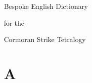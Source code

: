 \documentclass[12pt,a4paper,twoside]{article} %
\begin{document}
\pagestyle{empty}
\headrule
\vspace{1cm}

\huge
\noindent Bespoke English Dictionary

\noindent for the  

\noindent Cormoran Strike Tetralogy
\vspace{0.7cm}
\footrule

\normalsize
\newpage
\phantom{text}

\newpage
\pagestyle{fancy} 

\section*{A}
\end{document}
